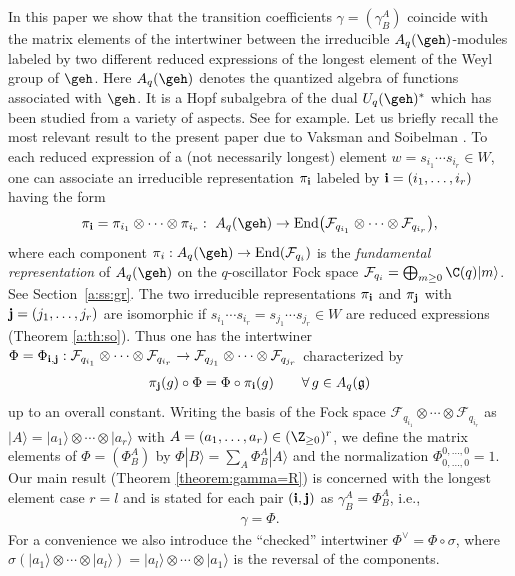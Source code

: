 In this paper we show that the transition coef\/f\/icients
$\gamma=(\gamma^A_B)$ coincide with
the matrix elements of the intertwiner between the irreducible $A_q(\geh)$-modules labeled by two dif\/ferent reduced expressions of the longest element of the Weyl group of $\geh$.
Here $A_q(\geh)$ denotes the quantized algebra of functions  associated with
$\geh$.
It is a Hopf subalgebra of the dual $U_q(\geh)^\ast$
which has been studied from a variety of aspects.
See \cite{D86,Kas93,NYM,RTF,So1,So2,VS} for example.
Let us brief\/ly recall the most relevant result to the present paper
due to Vaksman and Soibelman \cite{So1,So2,VS}.
To each reduced expression of a (not necessarily longest) element
$w = s_{i_1}\cdots s_{i_r} \in W$,
one can associate an irreducible representation
$\pi_{\bf i}$
labeled by ${\bf i}=(i_1,\ldots, i_r)$ having the form
\begin{gather*}
\pi_{\bf i}= \pi_{i_1}\otimes \cdots \otimes \pi_{i_r}: \
A_q(\geh) \rightarrow
\mathrm{End}\big(\mathcal{F}_{q_{i_1}} \otimes \cdots \otimes
\mathcal{F}_{q_{i_r}}\big),
\end{gather*}
where each component
$\pi_i: A_q(\geh) \rightarrow \mathrm{End}(\mathcal{F}_{q_i})$ is the
{\em fundamental representation} of $A_q(\geh)$ on
the $q$-oscillator Fock space
$\mathcal{F}_{q_i} = \bigoplus_{m\ge 0}\C(q)|m\rangle$.
See Section~\ref{a:ss:gr}.
The two irreducible representations $\pi_{\bf i}$ and
$\pi_{\bf j}$ with ${\bf j}=(j_1,\ldots, j_r)$
are isomorphic if
$s_{i_1}\cdots s_{i_r}=s_{j_1}\cdots s_{j_r} \in W$
are reduced expressions (Theorem \ref{a:th:so}).
Thus one has the intertwiner
$\Phi = \Phi_{{\bf i}, {\bf j}}:
\mathcal{F}_{q_{i_1}}\otimes \cdots \otimes \mathcal{F}_{q_{i_r}}
\rightarrow
\mathcal{F}_{q_{j_1}}\otimes \cdots \otimes \mathcal{F}_{q_{j_r}}$
characterized by
\begin{gather*}
\pi_{\bf j}(g)\circ \Phi = \Phi \circ \pi_{\bf i}(g)\qquad
\forall \, g \in A_q(\mathfrak{g})
\end{gather*}
up to an overall constant.
Writing the basis of the Fock space
$\mathcal{F}_{q_{i_1}} \otimes \cdots \otimes
\mathcal{F}_{q_{i_r}}$ as
$|A\rangle = |a_1\rangle \otimes \cdots \otimes |a_r\rangle$
with $A=(a_1, \ldots, a_r) \in (\Z_{\ge 0})^r$,
we def\/ine the matrix elements of $\Phi=(\Phi^A_B)$ by
$\Phi |B\rangle = \sum_A \Phi^A_B |A\rangle$ and the
normalization $\Phi^{0,\ldots, 0}_{0,\ldots, 0}=1$.
Our main result (Theorem \ref{theorem:gamma=R})
is concerned with the longest element case $r=l$
and is stated for each pair $({\bf i}, {\bf j})$ as $\gamma^A_B = \Phi^A_B$, i.e.,
\begin{gather}\label{a:main}
\gamma= \Phi.
\end{gather}
For a convenience we also introduce the ``checked'' intertwiner
$\Phi^{\vee} = \Phi \circ \sigma$, where
$\sigma  (|a_1\rangle \otimes \cdots \otimes |a_l\rangle) =
 |a_l\rangle \otimes \cdots \otimes |a_1 \rangle$
is the reversal of the components.
